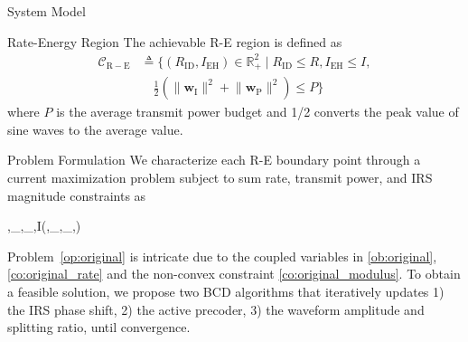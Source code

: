 \documentclass[journal]{IEEEtran}
\begin{document}
\begin{section}{System Model}
		\begin{subsection}{Rate-Energy Region}
			The achievable R-E region is defined as
			\begin{align}
				\mathcal{C}_{\mathrm{R-E}}
				&\triangleq \biggl\{(R_{\mathrm{ID}}, I_{\mathrm{EH}}) \in \mathbb{R}_+^2 \mid R_{\mathrm{ID}} \le R, I_{\mathrm{EH}} \le I,\nonumber\\
				&\quad \frac{1}{2}\left(\lVert{\boldsymbol{w}_{\mathrm{I}}}\rVert^2+\lVert{\boldsymbol{w}_{\mathrm{P}}}\rVert^2\right) \le P\biggr\}
			\end{align}
			where $P$ is the average transmit power budget and \num{1/2} converts the peak value of sine waves to the average value.
		\end{subsection}
	\end{section}


	\begin{section}{Problem Formulation}\label{se:problem_formulation}
		We characterize each R-E boundary point through a current maximization problem subject to sum rate, transmit power, and IRS magnitude constraints as
		\begin{maxi!}
			{\boldsymbol{\phi},_{},_{},\rho}{I(\boldsymbol{\phi},_{},_{},\rho)}{\label{op:original}}{\label{ob:original}}
			\label{co:original_rate}
			\label{co:original_power}
			\label{co:original_modulus}
		\end{maxi!}
		Problem~\eqref{op:original} is intricate due to the coupled variables in \eqref{ob:original}, \eqref{co:original_rate} and the non-convex constraint \eqref{co:original_modulus}. To obtain a feasible solution, we propose two BCD algorithms that iteratively updates 1) the IRS phase shift, 2) the active precoder, 3) the waveform amplitude and splitting ratio, until convergence.



\end{section}
\end{document}
